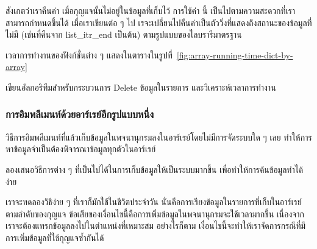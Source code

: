 สังเกต{\wbr}ว่า{\wbr}เรา{\wbr}คืน{\wbr}ค่า {} เมื่อ{\wbr}กุญแจ{\wbr}นั้น{\wbr}ไม่{\wbr}อยู่{\wbr}ใน{\wbr}ข้อมูล{\wbr}ที่{\wbr}เก็บ{\wbr}ไว้ การ{\wbr}ใช้{\wbr}ค่า {} นี้{\wbr}
เป็น{\wbr}ไป{\wbr}ตาม{\wbr}ความ{\wbr}สะดวก{\wbr}ที่{\wbr}เรา{\wbr}สามารถ{\wbr}กำหนด{\wbr}ขึ้น{\wbr}ได้ เมื่อ{\wbr}เรา{\wbr}เขียน{\wbr}ต่อ ๆ ไป{\wbr}
เรจะ{\wbr}เปลี่ยน{\wbr}ไป{\wbr}คืน{\wbr}ค่า{\wbr}เป็น{\wbr}ตัว{\wbr}วิ่ง{\wbr}ที่{\wbr}แสดง{\wbr}ถึง{\wbr}สถานะ{\wbr}ของ{\wbr}ข้อมูล{\wbr}ที่{\wbr}ไม่{\wbr}มี (เช่น{\wbr}ที่{\wbr}คืน{\wbr}จาก {\ct
  list\_itr\_end} เป็นต้น) ตาม{\wbr}รูปแบบ{\wbr}ของ{\wbr}ไลบ{\wbr}รา{\wbr}รี{\wbr}มาตรฐาน{\wbr}

เวลา{\wbr}การ{\wbr}ทำงาน{\wbr}ของ{\wbr}ฟังก์ชั่น{\wbr}ต่าง ๆ
แสดง{\wbr}ใน{\wbr}ตาราง{\wbr}ใน{\wbr}รูป{\wbr}ที่~\ref{fig:array-running-time-dict-by-array}

\begin{quiz}{}
เขียน{\wbr}อัล{\wbr}กอ{\wbr}ริ{\wbr}ทึม{\wbr}สำหรับ{\wbr}กระบวนการ Delete ข้อมูล{\wbr}ใน{\wbr}รายการ และ{\wbr}วิเคราะห์{\wbr}เวลา{\wbr}การ{\wbr}ทำงาน{\wbr}
\end{quiz}

\subsubsection{การ{\wbr}อิม{\wbr}พลี{\wbr}เมนท์{\wbr}ด้วย{\wbr}อาร์เรย์{\wbr}อีก{\wbr}รูปแบบ{\wbr}หนึ่ง}
วิธีการ{\wbr}อิม{\wbr}พลี{\wbr}เมนท์{\wbr}ที่แล้ว{\wbr}เก็บ{\wbr}ข้อมูล{\wbr}ใน{\wbr}พจนานุกรม{\wbr}ลง{\wbr}ใน{\wbr}อาร์เรย์{\wbr}โดย{\wbr}ไม่{\wbr}มี{\wbr}การ{\wbr}จัด{\wbr}ระบบ{\wbr}ใด ๆ เลย{\wbr}
ทำ{\wbr}ให้การ{\wbr}หา{\wbr}ข้อมูล{\wbr}จำเป็น{\wbr}ต้อง{\wbr}พิจารณา{\wbr}ข้อมูล{\wbr}ทุก{\wbr}ตัว{\wbr}ใน{\wbr}อาร์เรย์

\begin{quiz}{}
ลอง{\wbr}เสนอ{\wbr}วิธีการ{\wbr}ต่าง ๆ ที่{\wbr}เป็น{\wbr}ไป{\wbr}ได้{\wbr}ใน{\wbr}การ{\wbr}เก็บ{\wbr}ข้อมูล{\wbr}ให้{\wbr}เป็น{\wbr}ระบบ{\wbr}มาก{\wbr}ขึ้น{\wbr}
เพื่อ{\wbr}ทำ{\wbr}ให้การ{\wbr}ค้น{\wbr}ข้อมูล{\wbr}ทำ{\wbr}ได้{\wbr}ง่าย{\wbr}
\end{quiz}

เรา{\wbr}จะ{\wbr}ทดลอง{\wbr}วิธี{\wbr}ง่าย ๆ ที่{\wbr}เรา{\wbr}ก็{\wbr}มัก{\wbr}ใช้{\wbr}ใน{\wbr}ชีวิต{\wbr}ประจำวัน{\wbr}
นั่น{\wbr}คือ{\wbr}การ{\wbr}เรียง{\wbr}ข้อมูล{\wbr}ใน{\wbr}รายการ{\wbr}ที่{\wbr}เก็บ{\wbr}ใน{\wbr}อาร์เรย์{\wbr}ตาม{\wbr}ลำดับ{\wbr}ของ{\wbr}กุญแจ{\wbr}
ข้อเสีย{\wbr}ของ{\wbr}เงื่อนไข{\wbr}นี้{\wbr}คือ{\wbr}การ{\wbr}เพิ่ม{\wbr}ข้อมูล{\wbr}ใน{\wbr}พจนานุกรม{\wbr}จะ{\wbr}ใช้เวลา{\wbr}มาก{\wbr}ขึ้น{\wbr}
เนื่องจาก{\wbr}เรา{\wbr}จะ{\wbr}ต้อง{\wbr}แทรก{\wbr}ข้อมูล{\wbr}ลง{\wbr}ไป{\wbr}ใน{\wbr}ตำแหน่ง{\wbr}ที่{\wbr}เหมาะสม อย่างไรก็ตาม{\wbr}
เงื่อนไข{\wbr}นี้{\wbr}จะ{\wbr}ทำ{\wbr}ให้{\wbr}เรา{\wbr}จัดการ{\wbr}กรณี{\wbr}ที่{\wbr}มี{\wbr}การ{\wbr}เพิ่ม{\wbr}ข้อมูล{\wbr}ที่{\wbr}ใช้{\wbr}กุญแจ{\wbr}ซ้ำ{\wbr}กัน{\wbr}ได้{\wbr}

